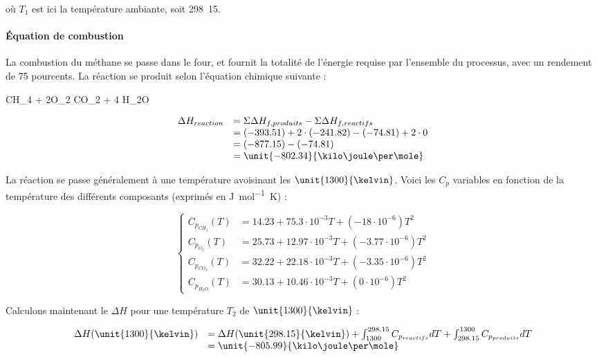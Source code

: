 où $T_1$ est ici la température ambiante, soit \unit{298.15}{\kelvin}.

\paragraph{\'Equation de combustion}
La combustion du méthane se passe dans le four, et fournit la totalité de l'énergie 
requise par l'ensemble du processus, avec un rendement de 75 pourcents.
La réaction se produit selon l'équation chimique suivante :

\begin{chemmath}
	CH_4 + 2O_2 \Longrightarrow CO_2 + 4 H_2O
\end{chemmath}

$$
	\begin{array}{rl}
	\Delta H_{reaction}		&=  \Sigma \Delta H_{f,produits} - \Sigma \Delta H_{f,reactifs} \\
												&=  (-393.51) + 2\cdot(-241.82) - (-74.81) + 2\cdot0 \\
												&=  (-877.15) - (-74.81)\\
												&=  \unit{-802.34}{\kilo\joule\per\mole}
	\end{array}
$$

La réaction se passe généralement à une température avoisinant les $\unit{1300}{\kelvin}$.
Voici les $C_p$ variables en fonction de la température des différents composants\cite{hc-table} 
(exprimés en \unit{\joule\per\mole\kelvin}) :

$$
	\left\{
		\begin{array}{rl}
			C_{p_{CH_4}}(T) 	&= 14.23 + 75.3\cdot10^{-3}T + (-18\cdot10^{-6})T^2 \\
			C_{p_{O_2}}(T) 		&= 25.73 + 12.97\cdot10^{-3}T + (-3.77\cdot10^{-6})T^2 \\
			C_{p_{CO_2}}(T) 	&= 32.22 + 22.18\cdot10^{-3}T + (-3.35\cdot10^{-6})T^2 \\
			C_{p_{H_2O}}(T) 	&= 30.13 + 10.46\cdot10^{-3}T + (0\cdot10^{-6})T^2 
		\end{array}
	\right.
$$	

Calculons maintenant le $\Delta H$ pour une température $T_2$ de $\unit{1300}{\kelvin}$ :

$$
	\begin{array}{rl}
		 	\Delta H(\unit{1300}{\kelvin}) 	&=  \Delta H(\unit{298.15}{\kelvin}) + \int_{1300}^{298.15} C_{p_{reactifs}} dT + \int_{298.15}^{1300} C_{p_{produits}} dT \\
																			&=  \unit{-805.99}{\kilo\joule\per\mole}
	\end{array}
$$	

